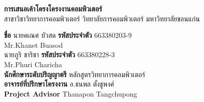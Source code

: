 \begin{center}
{\fontsize{16}{20}\selectfont\bfseries การเสนอเค้าโครงโครงงานคอมพิวเตอร์}\\
{\fontsize{16}{20}\selectfont สาขาวิชาวิทยาการคอมพิวเตอร์  วิทยาลัยการคอมพิวเตอร์  มหาวิทยาลัยขอนแก่น}
\end{center}

{\fontsize{14}{17}\selectfont
\noindent\textbf{ชื่อ} \quad นายคเณศ บัวสด \textbf{รหัสประจำตัว} 663380203-9\\
\hspace*{2.0cm} Mr.Khanet Buasod\\
\hspace*{2.0cm} นายภูริ ชาริชา \quad \textbf{รหัสประจำตัว} 663380228-3\\
\hspace*{2.0cm} Mr.Phuri Charicha\\
\textbf{นักศึกษาระดับปริญญาตรี} หลักสูตรวิทยาการคอมพิวเตอร์\\
\textbf{อาจารย์ที่ปรึกษาโครงงาน} อ.ธนพล ตั้งชูพงศ์\\
\textbf{Project Advisor} \hspace{1.5cm} Thanapon Tangchupong
}

\pagestyle{empty}
